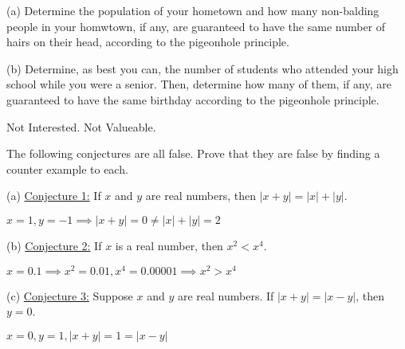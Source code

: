 \begin{problem}
	(a) Determine the population of your hometown and how many non-balding people in your homwtown, if any, are guaranteed to have the same number of hairs on their head, according to the pigeonhole principle.

	(b) Determine, as best you can, the number of students who attended your high school while you were a senior. Then, determine how many of them, if any, are guaranteed to have the same birthday according to the pigeonhole principle.
\end{problem}

\begin{solution} Not Interested. Not Valueable. \end{solution}

\begin{problem} 
	The following conjectures are all false. Prove that they are false by finding a counter example to each.

(a) \underline{Conjecture 1:} If $x$ and $y$ are real numbers, then $|x+y| = |x| + |y|$.

\begin{solution}
	$x = 1, y = -1 \implies |x+y| = 0 \neq |x| + |y| = 2$
\end{solution}

(b) \underline{Conjecture 2:} If $x$ is a real number, then $x^2 < x^4$.

\begin{solution}
	$x = 0.1 \implies x^2 = 0.01, x^4 = 0.00001 \implies x^2 > x^4$
\end{solution}

(c) \underline{Conjecture 3:} Suppose $x$ and $y$ are real numbers. If $|x+y| = |x-y|$, then $y = 0$.

\begin{solution}
	$x = 0, y = 1, |x+y| = 1 = |x-y|$
\end{solution}
\end{problem}


